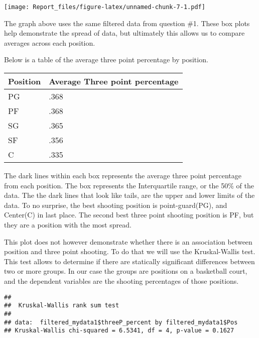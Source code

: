 \documentclass[
]{article}
\newenvironment{Shaded}{\begin{snugshade}}{\end{snugshade}}
\newcommand{\FunctionTok}[1]{\textcolor[rgb]{0.13,0.29,0.53}{\textbf{#1}}}
\newcommand{\NormalTok}[1]{#1}
\newcommand{\SpecialCharTok}[1]{\textcolor[rgb]{0.81,0.36,0.00}{\textbf{#1}}}
\begin{document}
\texttt{[image: Report\_files/figure-latex/unnamed-chunk-7-1.pdf]}

The graph above uses the same filtered data from question \#1. These box
plots help demonstrate the spread of data, but ultimately this allows us
to compare averages across each position.

Below is a table of the average three point percentage by position.

\begin{longtable}[]{@{}ll@{}}
\toprule\noalign{}
Position & Average Three point percentage \\
\midrule\noalign{}
\endhead
\bottomrule\noalign{}
\endlastfoot
PG & .368 \\
PF & .368 \\
SG & .365 \\
SF & .356 \\
C & .335 \\
\end{longtable}

The dark lines within each box represents the average three point
percentage from each position. The box represents the Interquartile
range, or the 50\% of the data. The the dark lines that look like tails,
are the upper and lower limits of the data. To no surprise, the best
shooting position is point-guard(PG), and Center(C) in last place. The
second best three point shooting position is PF, but they are a position
with the most spread.

This plot does not however demonstrate whether there is an association
between position and three point shooting. To do that we will use the
Kruskal-Wallis test. This test allows to determine if there are
statically significant differences between two or more groups. In our
case the groups are positions on a basketball court, and the dependent
variables are the shooting percentages of those positions.

\begin{Shaded}
\end{Shaded}

\begin{verbatim}
## 
##  Kruskal-Wallis rank sum test
## 
## data:  filtered_mydata1$threeP_percent by filtered_mydata1$Pos
## Kruskal-Wallis chi-squared = 6.5341, df = 4, p-value = 0.1627
\end{verbatim}
\end{document}
